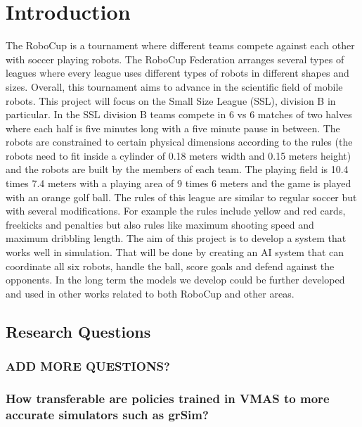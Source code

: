 \section{Introduction}
\label{section:intro}

The RoboCup \cite{RoboCupSSL} is a tournament where different teams compete against each other with soccer playing robots. The RoboCup Federation arranges several types of leagues where every league uses different types of robots in different shapes and sizes. Overall, this tournament aims to advance in the scientific field of mobile robots. 
This project will focus on the Small Size League (SSL), division B in particular. In the SSL division B teams compete in 6 vs 6 matches of two halves where each half is five minutes long with a five minute pause in between. The robots are constrained to certain physical dimensions according to the rules (the robots need to fit inside a cylinder of 0.18 meters width and 0.15 meters height) and the robots are built by the members of each team. The playing field is 10.4 times 7.4 meters with a playing area of 9 times 6 meters and the game is played with an orange golf ball. The rules of this league are similar to regular soccer but with several modifications. For example the rules include yellow and red cards, freekicks and penalties but also rules like maximum shooting speed and maximum dribbling length. 
The aim of this project is to develop a system that works well in simulation. That will be done by creating an AI system that can coordinate all six robots, handle the ball, score goals and defend against the opponents. In the long term the models we develop could be further developed and used in other works related to both RoboCup and other areas.

\subsection{Research Questions}

\subsubsection{ADD MORE QUESTIONS?}
\subsubsection{How transferable are policies trained in VMAS to more accurate simulators such as grSim?}

